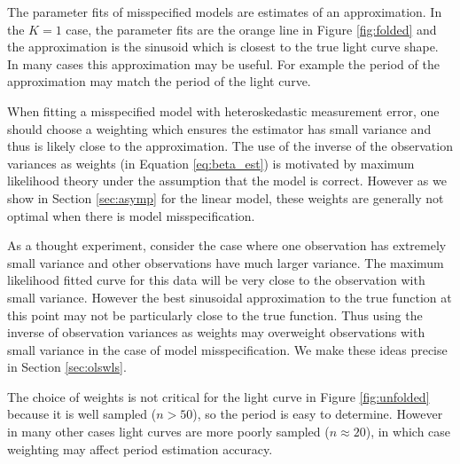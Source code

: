 \documentclass[ejs,ps,preprint]{imsart}
\numberwithin{equation}{section}
\theoremstyle{plain}
\begin{document}
The parameter fits of misspecified models are estimates of an approximation. In the $K=1$ case, the parameter fits are the orange line in Figure \ref{fig:folded} and the approximation is the sinusoid which is closest to the true light curve shape. In many cases this approximation may be useful. For example the period of the approximation may match the period of the light curve.

When fitting a misspecified model with heteroskedastic measurement error, one should choose a weighting which ensures the estimator has small variance and thus is likely close to the approximation. The use of the inverse of the observation variances as weights (in Equation \eqref{eq:beta_est}) is motivated by maximum likelihood theory under the assumption that the model is correct. However as we show in Section \ref{sec:asymp} for the linear model, these weights are generally not optimal when there is model misspecification.

As a thought experiment, consider the case where one observation has extremely small variance and other observations have much larger variance. The maximum likelihood fitted curve for this data will be very close to the observation with small variance. However the best sinusoidal approximation to the true function at this point may not be particularly close to the true function. Thus using the inverse of observation variances as weights may overweight observations with small variance in the case of model misspecification. We make these ideas precise in Section \ref{sec:olswls}.

The choice of weights is not critical for the light curve in Figure \ref{fig:unfolded} because it is well sampled ($n > 50$), so the period is easy to determine. However in many other cases light curves are more poorly sampled ($n \approx 20$), in which case weighting may affect period estimation accuracy.
\end{document}
